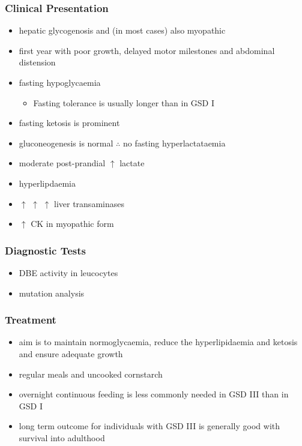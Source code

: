 \documentclass{scrartcl}
\begin{document}
\subsubsection{Clinical Presentation}
\label{sec:orgb7f0025}
\begin{itemize}
\item hepatic glycogenosis and (in most cases) also myopathic
\item first year with poor growth, delayed motor milestones and abdominal
distension
\item fasting hypoglycaemia 
\begin{itemize}
\item Fasting tolerance is usually longer than in GSD I
\end{itemize}
\item fasting ketosis is prominent
\item gluconeogenesis is normal \(\therefore\) no fasting hyperlactataemia
\item moderate post-prandial \(\uparrow\) lactate
\item hyperlipdaemia
\item \(\uparrow\) \(\uparrow\) \(\uparrow\) liver transaminases
\item \(\uparrow\) CK in myopathic form
\end{itemize}
\subsubsection{Diagnostic Tests}
\label{sec:org7594aa0}
\begin{itemize}
\item DBE activity in leucocytes
\item mutation analysis
\end{itemize}
\subsubsection{Treatment}
\label{sec:orgc272037}
\begin{itemize}
\item aim is to maintain normoglycaemia, reduce the hyperlipidaemia and ketosis and
ensure adequate growth
\item regular meals and uncooked cornstarch
\item overnight continuous feeding is less commonly needed in GSD III than
in GSD I
\item long term outcome for individuals with GSD III is generally good
with survival into adulthood
\end{itemize}
\end{document}
